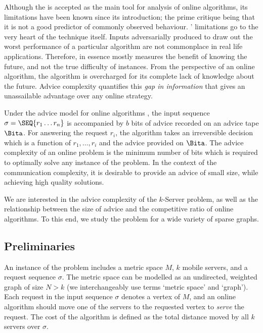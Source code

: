 Although the {\ca} is accepted as the main tool for analysis of online algorithms, its limitations have been known since its introduction; the prime critique being that it is not a good predictor of commonly observed behaviour.
{\Ca}' limitations go to the very heart of the technique itself. Inputs adversarially produced to draw out the worst performance of a particular algorithm are not commonplace in real life applications. Therefore, in essence {\ca} mostly measures the benefit of knowing the future, and not the true difficulty of instances. From the perspective of an online algorithm, the algorithm is overcharged for its complete lack of knowledge about the future.
Advice complexity quantifies this {\it gap in information} that gives \OPT an unassailable advantage over any online strategy. 

Under the advice model for online algorithms \cite{Emek2011,Bock11}, the input sequence $\sigma = \SEQ{r_1 \ldots r_n }$ is accompanied by $b$ bits of advice recorded on an advice tape $\Bita$. For answering the request $r_i$, the algorithm takes an irreversible decision which is a function of $r_1 , \ldots, r_i$ and the advice provided on $\Bita$.  The advice complexity of an online problem is the minimum number of bits which is required to optimally solve any instance of the problem.  In the context of the communication complexity, it is desirable to provide an advice of small size, while achieving high quality solutions. 

We are interested in the advice complexity of the $k$-{\sc Server} problem, as well as the relationship between the size of advice and the competitive ratio of online algorithms. 
To this end, we study the problem for a wide variety of sparse graphs. 

\subsection{Preliminaries}
An instance of the \kc problem includes a metric space $M$, $k$ mobile servers, and a request 
sequence $\sigma$. The metric space can be modelled as an undirected, weighted graph of size $N>k$ (we interchangeably use terms `metric space' and `graph'). Each request 
in the input sequence $\sigma$ denotes a vertex of $M$, and an online algorithm should move one of the servers to the requested vertex to 
\textit{serve} the request. The cost of the algorithm is defined as the total distance moved by all $k$ servers over $\sigma$. 

